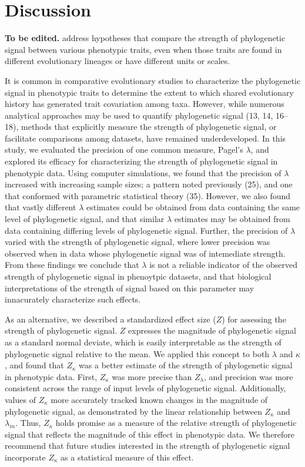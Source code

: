 \documentclass[9pt,twocolumn,twoside,lineno]{pnas-new}
\begin{document}
\hypertarget{discussion}{%
\section{Discussion}\label{discussion}}

\textbf{To be edited.} address hypotheses that compare the strength of
phylogenetic signal between various phenotypic traits, even when those
traits are found in different evolutionary lineages or have different
units or scales.

It is common in comparative evolutionary studies to characterize the
phylogenetic signal in phenotypic traits to determine the extent to
which shared evolutionary history has generated trait covariation among
taxa. However, while numerous analytical approaches may be used to
quantify phylogenetic signal (13, 14, 16--18), methods that explicitly
measure the strength of phylogenetic signal, or facilitate comparisons
among datasets, have remained underdeveloped. In this study, we
evaluated the precision of one common measure, Pagel's \(\lambda\), and
explored its efficacy for characterizing the strength of phylogenetic
signal in phenotypic data. Using computer simulations, we found that the
precision of \(\lambda\) increased with increasing sample sizes; a
pattern noted previously (25), and one that conformed with parametric
statistical theory (35). However, we also found that vastly different
\(\lambda\) estimates could be obtained from data containing the same
level of phylogenetic signal, and that similar \(\lambda\) estimates may
be obtained from data containing differing levels of phylogenetic
signal. Further, the precision of \(\lambda\) varied with the strength
of phylogenetic signal, where lower precision was observed when in data
whose phylogenetic signal was of intemediate strength. From these
findings we conclude that \(\lambda\) is not a reliable indicator of the
observed strength of phylogenetic signal in phenoytpic datasets, and
that biological interpretations of the strength of signal based on this
parameter may innacurately characterize such effects.

As an alternative, we described a standardized effect size (\(Z\)) for
assessing the strength of phylogenetic signal. \(Z\) expresses the
magnitude of phylogenetic signal as a standard normal deviate, which is
easily interpretable as the strength of phylogenetic signal relative to
the mean. We applied this concept to both \(\lambda\) and \(\kappa\),
and found that \(Z_\kappa\) was a better estimate of the strength of
phylogenetic signal in phenotypic data. First, \(Z_\kappa\) was more
precise than \(Z_\lambda\), and precision was more consistent across the
range of input levels of phylogenetic signal. Additionally, values of
\(Z_\kappa\) more accurately tracked known changes in the magnitude of
phylogenetic signal, as demonstrated by the linear relationship between
\(Z_\kappa\) and \(\lambda_{in}\). Thus, \(Z_\kappa\) holds promise as a
measure of the relative strength of phylogenetic signal that reflects
the magnitude of this effect in phenotypic data. We therefore recommend
that future studies interested in the strength of phylogenetic signal
incorporate \(Z_\kappa\) as a statistical measure of this effect.
\end{document}

